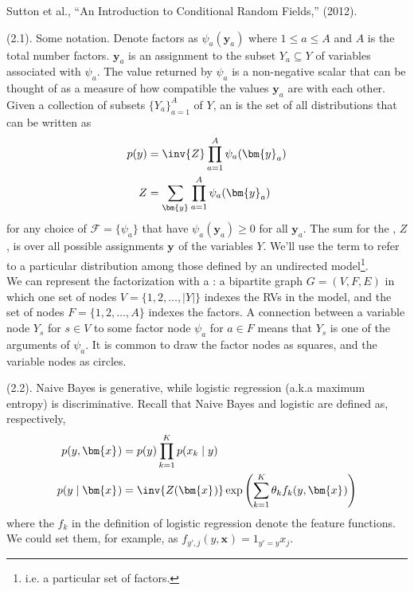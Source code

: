 \documentclass[11pt]{article}
\renewcommand\vec[2][]{\bm{#2}_{#1}}
\newcommand\myspace[1][]{\vspace{#1\bigskipamount}}
\newcommand\p{\Needspace{10\baselineskip} \noindent}
\begin{document}
\vspace{-1em}
{\footnotesize Sutton et al., ``An Introduction to Conditional Random Fields,'' (2012).}



\p {} (2.1). Some notation. Denote factors as $\psi_a(\vec[a]{y})$ where $1 \le a \le A$ and $A$ is the total number factors. $\vec[a]{y}$ is an assignment to the subset $Y_a \subseteq Y$ of variables associated with $\psi_a$. The value returned by $\psi_a$ is a non-negative scalar that can be thought of as a measure of how compatible the values $\vec[a]{y}$ are with each other. Given a collection of subsets $\{Y_a\}_{a=1}^{A}$ of $Y$, an  is the set of all distributions that can be written as
\begin{align}
	p(y) &= \inv{Z} \prod_{a=1}^A \psi_a(\vec[a]{y}) \\
	Z &= \sum_{\vec{y}} \prod_{a=1}^A \psi_a(\vec[a]{y})
\end{align}
for any choice of  $\mathcal{F} = \{\psi_a\}$ that have $\psi_a(\vec[a]{y}) \ge 0$ for all $\vec[a]{y}$. The sum for the , $Z$, is over all possible assignments $\vec{y}$ of the variables $Y$. We'll use the term  to refer to a particular distribution among those defined by an undirected model\footnote{i.e. a particular set of factors.}. \\

\p We can represent the factorization with a : a bipartite graph $G = (V, F, E)$ in which one set of nodes $V = \{1, 2, \ldots, |Y| \}$ indexes the RVs in the model, and the set of nodes $F= \{1, 2, \ldots, A\}$ indexes the factors. A connection between a variable node $Y_s$ for $s \in V$ to some factor node $\psi_a$ for $a \in F$ means that $Y_s$ is one of the arguments of $\psi_a$. It is common to draw the factor nodes as squares, and the variable nodes as circles.


\myspace
\p {} (2.2). Naive Bayes is generative, while logistic regression (a.k.a maximum entropy) is discriminative. Recall that Naive Bayes and logistic are defined as, respectively,
\begin{align}
	p(y, \vec{x}) &= p(y) \prod_{k = 1}^{K} p(x_k \mid y) \\
	p(y \mid \vec{x}) &= \inv{Z(\vec{x})} \exp \left( \sum_{k = 1}^K \theta_{k} f_k(y, \vec{x})  \right)
\end{align}
where the $f_k$ in the definition of logistic regression denote the feature functions. We could set them, for example, as $f_{y', j} (y, \vec{x}) = 1_{y' = y} x_j$. \\
\end{document}
